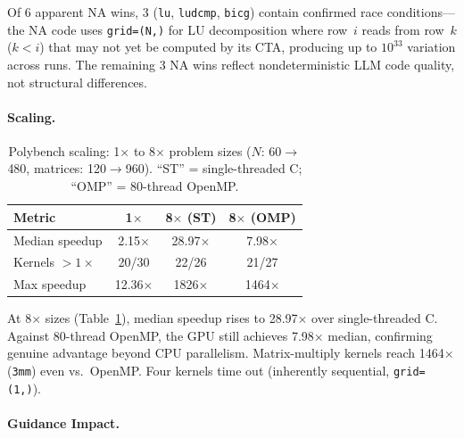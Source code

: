 \documentclass[sigconf]{acmart}
\begin{document}
Of 6 apparent NA wins, 3 (\texttt{lu}, \texttt{ludcmp}, \texttt{bicg})
contain confirmed race conditions---the NA code uses
\texttt{grid=(N,)} for LU decomposition where row~$i$ reads from
row~$k$ ($k<i$) that may not yet be computed by its CTA, producing up
to $10^{33}$ variation across runs.  The remaining 3 NA wins reflect
nondeterministic LLM code quality, not structural differences.

\paragraph{Scaling.}

\begin{table}[t]
  \caption{Polybench scaling: 1$\times$ to 8$\times$ problem sizes
    ($N$: 60$\to$480, matrices: 120$\to$960).
    ``ST'' = single-threaded C; ``OMP'' = 80-thread OpenMP.}
  \label{tab:results_8x}
  \centering\small
  \begin{tabular}{lccc}
    \toprule
    \textbf{Metric} & \textbf{1$\times$} & \textbf{8$\times$ (ST)} & \textbf{8$\times$ (OMP)} \\
    \midrule
    Median speedup     & 2.15$\times$ & 28.97$\times$ & 7.98$\times$ \\
    Kernels $>1\times$ & 20/30        & 22/26         & 21/27        \\
    Max speedup        & 12.36$\times$ & 1826$\times$ & 1464$\times$ \\
    \bottomrule
  \end{tabular}
\end{table}

At 8$\times$ sizes (Table~\ref{tab:results_8x}), median speedup
rises to 28.97$\times$ over single-threaded C.  Against 80-thread
OpenMP, the GPU still achieves 7.98$\times$ median, confirming
genuine advantage beyond CPU parallelism.  Matrix-multiply kernels
reach 1464$\times$ (\texttt{3mm}) even vs.\ OpenMP.  Four kernels
time out (inherently sequential, \texttt{grid=(1,)}).

\paragraph{Guidance Impact.}
\end{document}
